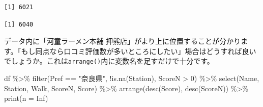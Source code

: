 \documentclass[
  a4paper,
  pandoc,
  ja=standard,
  jafont=haranoaji]{bxjsbook}
\newenvironment{Shaded}{\begin{snugshade}}{\end{snugshade}}
\newcommand{\AttributeTok}[1]{\textcolor[rgb]{0.00,0.48,0.65}{#1}}
\newcommand{\ConstantTok}[1]{\textcolor[rgb]{0.56,0.35,0.01}{#1}}
\newcommand{\DecValTok}[1]{\textcolor[rgb]{0.68,0.00,0.00}{#1}}
\newcommand{\FunctionTok}[1]{\textcolor[rgb]{0.28,0.35,0.67}{#1}}
\newcommand{\NormalTok}[1]{\textcolor[rgb]{0.00,0.48,0.65}{#1}}
\newcommand{\SpecialCharTok}[1]{\textcolor[rgb]{0.37,0.37,0.37}{#1}}
\newcommand{\StringTok}[1]{\textcolor[rgb]{0.13,0.47,0.30}{#1}}
\begin{document}
\begin{Shaded}
\end{Shaded}

\begin{verbatim}
[1] 6021
\end{verbatim}

\begin{Shaded}
\end{Shaded}

\begin{verbatim}
[1] 6040
\end{verbatim}

データ内に「河童ラーメン本舗
押熊店」がより上に位置することが分かります。「もし同点なら口コミ評価数が多いところにしたい」場合はどうすれば良いでしょうか。これは\texttt{arrange()}内に変数名を足すだけで十分です。

\begin{Shaded}
\begin{Highlighting}[numbers=left,,]
\NormalTok{df }\SpecialCharTok{\%\textgreater{}\%}
  \FunctionTok{filter}\NormalTok{(Pref }\SpecialCharTok{==} \StringTok{"奈良県"}\NormalTok{, }\SpecialCharTok{!}\FunctionTok{is.na}\NormalTok{(Station), ScoreN }\SpecialCharTok{\textgreater{}} \DecValTok{0}\NormalTok{) }\SpecialCharTok{\%\textgreater{}\%}
  \FunctionTok{select}\NormalTok{(Name, Station, Walk, ScoreN, Score) }\SpecialCharTok{\%\textgreater{}\%}
  \FunctionTok{arrange}\NormalTok{(}\FunctionTok{desc}\NormalTok{(Score), }\FunctionTok{desc}\NormalTok{(ScoreN)) }\SpecialCharTok{\%\textgreater{}\%}
  \FunctionTok{print}\NormalTok{(}\AttributeTok{n =} \ConstantTok{Inf}\NormalTok{)}
\end{Highlighting}
\end{Shaded}
\end{document}
